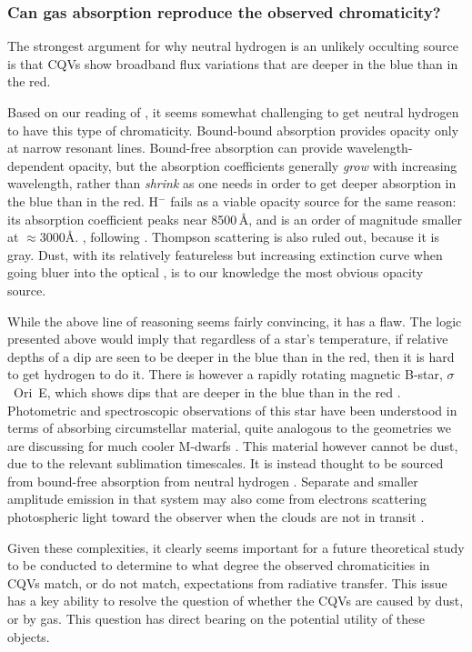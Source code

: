 \documentclass[11pt,twocolumn,tighten]{aastex63}
\begin{document}
\subsubsection{Can gas absorption reproduce the observed chromaticity?}
The strongest argument for why neutral hydrogen is an unlikely
occulting source is that CQVs show broadband flux
variations that are deeper in the blue than in the red.

Based on our reading of \citet[][Ch.~8]{1992oasp.book.....G},
it seems somewhat challenging to get neutral hydrogen to have this type of chromaticity.
Bound-bound absorption provides opacity only at narrow resonant lines.
Bound-free absorption can provide wavelength-dependent opacity, but the
absorption coefficients generally {\it grow} with increasing wavelength, rather
than {\it shrink} as one needs in order to get deeper absorption in
the blue than in the red.  H$^-$  fails as a viable opacity
source for the same reason: its absorption coefficient peaks near
8500\,\AA, and is an order of magnitude smaller at $\approx$3000\AA.
\citep{1992oasp.book.....G}, following \citet{1979MNRAS.187P..59W}.
Thompson scattering is also ruled out, because it is gray.
Dust, with its relatively featureless but increasing extinction curve
when going bluer into the optical \citep{1989ApJ...345..245C}, is to our knowledge the most
obvious opacity source.

While the above line of reasoning seems fairly convincing,
it has a flaw.
The logic presented above would imply that regardless of a star's temperature,
if relative depths of a dip are seen to be deeper in the blue than in the red,
then it is hard to get hydrogen to do it.
There is however a rapidly rotating 
magnetic B-star, $\sigma$~Ori~E, which shows dips that are deeper in the blue than in the red
\citep{1977ApJ...216L..31H}.
Photometric and spectroscopic observations of this star have been understood in terms of
absorbing circumstellar material, quite analogous to the geometries we are
discussing for much cooler M-dwarfs \citep{2005ApJ...630L..81T}.
This material however cannot be dust, due to the relevant sublimation timescales.
It is instead thought to be sourced from bound-free absorption from neutral hydrogen
\citep{2005ApJ...630L..81T}.  Separate and smaller amplitude
emission in that system may also 
come from electrons scattering photospheric light toward the observer 
when the clouds are not in transit \citep{2022MNRAS.511.4815B}.

Given these complexities, it clearly
seems important for a future theoretical study to be conducted to
determine to what degree the observed chromaticities in CQVs match, or do not
match, expectations from radiative transfer.
This issue has a key ability to resolve the question of whether the
CQVs are caused by dust, or by gas.
This question has direct bearing on the potential utility of these
objects.
\end{document}
